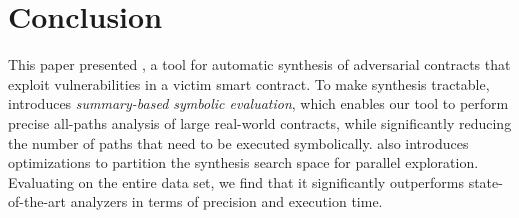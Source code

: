 \section{Conclusion}\label{sec:concl}
This paper presented \toolname, a tool for automatic synthesis of adversarial
contracts that exploit vulnerabilities in a victim smart contract. To make
synthesis tractable, \toolname introduces \emph{summary-based symbolic
evaluation}, which enables our tool to perform precise all-paths analysis of
large real-world contracts, while significantly reducing the number of paths
that need to be executed symbolically. \toolname also introduces optimizations
to partition the synthesis search space for parallel exploration. %
Evaluating \toolname on the entire
\etherscan data set, we find that it significantly outperforms  state-of-the-art
analyzers in terms of precision and execution time.
